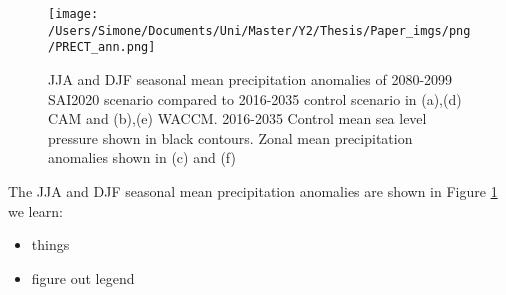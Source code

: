 \begin{figure}[H]
	\centering
	\texttt{[image: /Users/Simone/Documents/Uni/Master/Y2/Thesis/Paper\_imgs/png/PRECT\_ann.png]}
	\caption{JJA and DJF seasonal mean precipitation anomalies of 2080-2099 SAI2020 scenario compared to 2016-2035 control scenario in (a),(d) CAM and (b),(e) WACCM. 2016-2035 Control mean sea level pressure shown in black contours. Zonal mean precipitation anomalies shown in (c) and (f)}
	\label{fig:PRECT_seas}
\end{figure}

The JJA and DJF seasonal mean precipitation anomalies are shown in Figure \ref{fig:PRECT_seas} we learn:

\begin{itemize}
	\item things
\end{itemize}

\begin{itemize}
	\item figure out legend
\end{itemize}